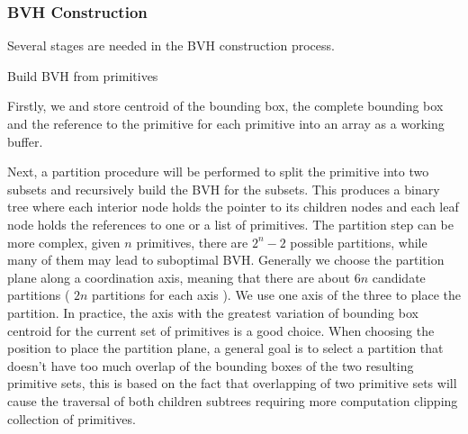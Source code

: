 \subsubsection{BVH Construction}
\label{subsubsec:bvh_construction}

Several stages are needed in the BVH construction process. 

\SetAlFnt{\small}
\begin{algorithm} 
	 

	\caption{Build BVH from primitives}
	\label{algo:BVH_construction} 

\end{algorithm}

Firstly, we and store centroid of the bounding box, the complete bounding box and the reference to the primitive for each primitive into an array as a working buffer.

Next, a partition procedure will be performed to split the primitive into two subsets and recursively build the BVH for the subsets. This produces a binary tree where each interior node holds the pointer to  its children nodes and each leaf node holds the references to one or a list of primitives. The partition step can be more complex, given \(n\) primitives, there are \( 2^n - 2 \) possible partitions, while many of them may lead to suboptimal BVH. Generally we choose the partition plane along a coordination axis, meaning that there are about \( 6n \) candidate partitions ( \( 2n \) partitions for each axis ). We use one axis of the three to place the partition. In practice, the axis with the greatest variation of bounding box centroid for the current set of primitives is a good choice. When choosing the position to place the partition plane, a general goal is to select a partition that doesn't have too much overlap of the bounding boxes of the two resulting primitive sets, this is based on the fact that overlapping of two primitive sets will cause the traversal of both children subtrees requiring more computation clipping collection of primitives. 

